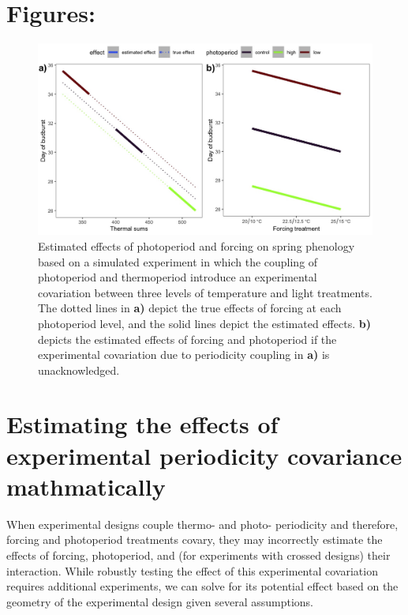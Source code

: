 \documentclass[11pt]{article}
\begin{document}
\section*{Figures:}
 \begin{figure}[h!]
    \centering
 \includegraphics[width=.7\textwidth]{..//Plots/periodicity_figures/apparent4spp.jpeg}
    \caption{Estimated effects of photoperiod and forcing on spring phenology based on a simulated experiment in which the coupling of photoperiod and thermoperiod introduce an experimental covariation between three levels of temperature and light treatments. The dotted lines in \textbf{a)} depict the true effects of forcing at each photoperiod level, and the solid lines depict the estimated effects. \textbf{b)} depicts the estimated effects of forcing and photoperiod if the experimental covariation due to periodicity coupling in \textbf{a)} is unacknowledged.}
    \label{fig:suplines}
\end{figure}

\section*{Estimating the effects of experimental periodicity covariance mathmatically}
When experimental designs couple thermo- and photo- periodicity and therefore, forcing and photoperiod treatments covary, they may incorrectly estimate the effects of forcing, photoperiod, and (for experiments with crossed designs) their interaction. While robustly testing the effect of this experimental covariation requires additional experiments, we can solve for its potential effect based on the geometry of the experimental design given several assumptions.
\end{document}
